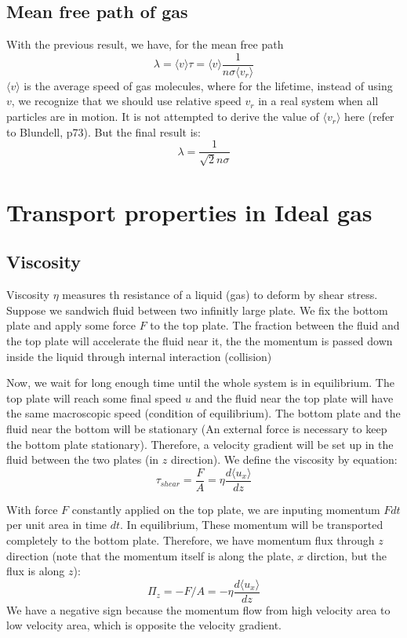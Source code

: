 \documentclass{article}
\begin{document}
\subsection*{Mean free path of gas}
With the previous result, we have, for the mean free path
\begin{equation}
    \lambda = \langle v \rangle \tau = \langle v \rangle \frac{1}{n\sigma \langle v_r\rangle }
\end{equation}
$\langle v \rangle$ is the average speed of gas molecules,
where for the lifetime, instead of using $v$, we recognize that we should use 
relative speed $v_r$ in a real system when all particles are in motion. It is not attempted to derive
the value of $\langle v_r\rangle$ here (refer to Blundell, p73). But the final result
is: 
\begin{equation}
    \lambda = \frac{1}{\sqrt{2}n\sigma}
\end{equation}

\section{Transport properties in Ideal gas}

\subsection{Viscosity}
Viscosity $\eta$ measures th resistance of a liquid (gas) to deform by shear stress. Suppose we sandwich fluid between 
two infinitly large plate. We fix the bottom plate and apply some force $F$ to the top plate. The fraction between the fluid and 
the top plate will accelerate the fluid near it, the the momentum is passed down inside the liquid through internal interaction (collision)

Now, we wait for long enough time until the whole system is in equilibrium. The top plate will reach some final speed $u$ and 
the fluid near the top plate will have the same macroscopic speed (condition of equilibrium). The bottom plate and the fluid near the bottom 
will be stationary (An external force is necessary to keep the bottom plate stationary). 
Therefore, a velocity gradient will be set up in the fluid between the two plates (in $z$ direction). We define 
the viscosity by equation:
\begin{equation}
    \tau_{shear} = \frac{F}{A} = \eta \frac{d \langle u_x \rangle}{dz}
\end{equation}

With force $F$ constantly applied on the top plate, we are inputing momentum $Fdt$ per unit area in time $dt$. In equilibrium, 
These momentum will be transported completely to the bottom plate. Therefore, we have momentum flux through $z$ direction 
(note that the momentum itself is along the plate, $x$ dirction, but the flux is along $z$):
\begin{equation}
    \Pi_z = - F / A = - \eta \frac{d \langle u_x \rangle}{dz}
\end{equation}
We have a negative sign because the momentum flow from high velocity area to low velocity area, which is opposite the velocity gradient.
\end{document}

